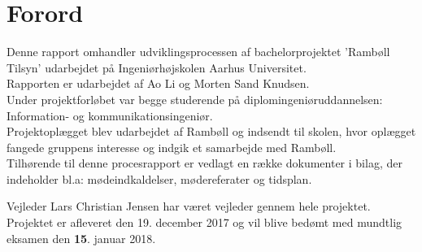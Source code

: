 \chapter*{Forord}
Denne rapport omhandler udviklingsprocessen af bachelorprojektet 'Rambøll Tilsyn' udarbejdet på Ingeniørhøjskolen Aarhus Universitet. \\
Rapporten er udarbejdet af Ao Li og Morten Sand Knudsen. \\ 
Under projektforløbet var begge studerende på diplomingeniøruddannelsen: Information- og kommunikationsingeniør. \\
Projektoplægget blev udarbejdet af Rambøll og indsendt til skolen, hvor oplægget fangede gruppens interesse og indgik et samarbejde med Rambøll. \\
Tilhørende til denne procesrapport er vedlagt en række dokumenter i bilag, der indeholder bl.a: mødeindkaldelser,
mødereferater og tidsplan. 

Vejleder Lars Christian Jensen har været vejleder gennem hele projektet. Projektet er afleveret den 19.
december 2017 og vil blive bedømt med mundtlig eksamen den \textbf{15}. januar 2018.